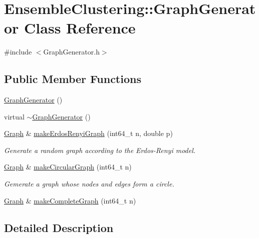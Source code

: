 \hypertarget{class_ensemble_clustering_1_1_graph_generator}{\section{Ensemble\-Clustering\-:\-:Graph\-Generator Class Reference}
\label{class_ensemble_clustering_1_1_graph_generator}
}


{\ttfamily \#include $<$Graph\-Generator.\-h$>$}

\subsection*{Public Member Functions}
\begin{DoxyCompactItemize}
\item 
\hyperlink{class_ensemble_clustering_1_1_graph_generator_a076eb95e34e465a0639844e79c79c4b0}{Graph\-Generator} ()
\item 
virtual \hyperlink{class_ensemble_clustering_1_1_graph_generator_a4f0b5374c64c6c81bf64e88a9b74b646}{$\sim$\-Graph\-Generator} ()
\item 
\hyperlink{class_ensemble_clustering_1_1_graph}{Graph} \& \hyperlink{class_ensemble_clustering_1_1_graph_generator_a468d366b781fcc9169a79c4e82209f65}{make\-Erdos\-Renyi\-Graph} (int64\-\_\-t n, double p)
\begin{DoxyCompactList}\small\item\em Generate a random graph according to the Erdos-\/\-Renyi model. \end{DoxyCompactList}\item 
\hyperlink{class_ensemble_clustering_1_1_graph}{Graph} \& \hyperlink{class_ensemble_clustering_1_1_graph_generator_a1e6842768d895f0e4fa1e24a87fdf55f}{make\-Circular\-Graph} (int64\-\_\-t n)
\begin{DoxyCompactList}\small\item\em Gemerate a graph whose nodes and edges form a circle. \end{DoxyCompactList}\item 
\hyperlink{class_ensemble_clustering_1_1_graph}{Graph} \& \hyperlink{class_ensemble_clustering_1_1_graph_generator_aaba3c61fd2aafae1f46b936e7a0dbc46}{make\-Complete\-Graph} (int64\-\_\-t n)
\end{DoxyCompactItemize}


\subsection{Detailed Description}


